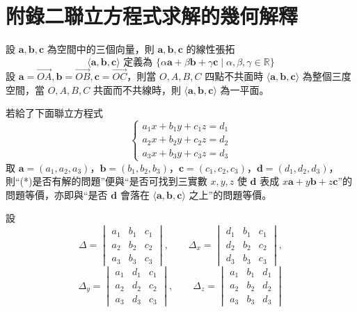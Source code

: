 \section*{附錄二\quad 聯立方程式求解的幾何解釋}
\label{sec:b3_a2}

\renewcommand{\thefigure}{附2-\arabic{figure}}
\setcounter{figure}{0}

設 $\mathbf{a}, \mathbf{b}, \mathbf{c}$ 為空間中的三個向量，則 $\mathbf{a}, \mathbf{b}, \mathbf{c}$ 的線性張拓
\[ \langle \mathbf{a}, \mathbf{b}, \mathbf{c} \rangle \text{ 定義為 } \{\alpha\mathbf{a} + \beta\mathbf{b} + \gamma\mathbf{c} \mid \alpha, \beta, \gamma \in \mathbb{R}\} \]
設 $\mathbf{a} = \vec{OA}, \mathbf{b} = \vec{OB}, \mathbf{c} = \vec{OC}$，則當 $O, A, B, C$ 四點不共面時 $\langle \mathbf{a}, \mathbf{b}, \mathbf{c} \rangle$ 為整個三度空間，當 $O, A, B, C$ 共面而不共線時，則 $\langle \mathbf{a}, \mathbf{b}, \mathbf{c} \rangle$ 為一平面。

若給了下面聯立方程式
\[
\begin{cases}
a_1 x + b_1 y + c_1 z = d_1 \\
a_2 x + b_2 y + c_2 z = d_2 \\
a_3 x + b_3 y + c_3 z = d_3
\end{cases}
\tag{$*$}
\]
取 $\mathbf{a} = (a_1, a_2, a_3)$，$\mathbf{b} = (b_1, b_2, b_3)$，$\mathbf{c} = (c_1, c_2, c_3)$，$\mathbf{d} = (d_1, d_2, d_3)$，則“(*)是否有解的問題”便與“是否可找到三實數 $x, y, z$ 使 $\mathbf{d}$ 表成 $x\mathbf{a} + y\mathbf{b} + z\mathbf{c}$”的問題等價，亦即與“是否 $\mathbf{d}$ 會落在 $\langle \mathbf{a}, \mathbf{b}, \mathbf{c} \rangle$ 之上”的問題等價。

設
\[
\Delta = \begin{vmatrix} a_1 & b_1 & c_1 \\ a_2 & b_2 & c_2 \\ a_3 & b_3 & c_3 \end{vmatrix}, \qquad
\Delta_x = \begin{vmatrix} d_1 & b_1 & c_1 \\ d_2 & b_2 & c_2 \\ d_3 & b_3 & c_3 \end{vmatrix},
\]
\[
\Delta_y = \begin{vmatrix} a_1 & d_1 & c_1 \\ a_2 & d_2 & c_2 \\ a_3 & d_3 & c_3 \end{vmatrix}, \qquad
\Delta_z = \begin{vmatrix} a_1 & b_1 & d_1 \\ a_2 & b_2 & d_2 \\ a_3 & b_3 & d_3 \end{vmatrix}
\]


